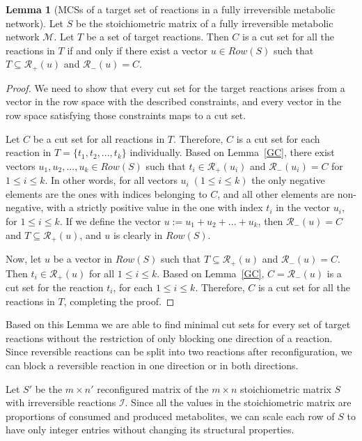 \documentclass{bioinfo}
\theoremstyle{plain}
\theoremstyle{definition}
\newtheorem{lemma}{Lemma} %
\begin{document}
\begin{lemma} [MCSs of a target set of reactions in a fully irreversible metabolic network] \label{FIR}
Let $S$ be the stoichiometric matrix of a fully irreversible metabolic network $\mathcal{M}$. Let $T$ be a set of target reactions. Then $C$ is a cut set for all the reactions in $T$ if and only if there exist a vector $u \in Row(S)$ such that $T \subseteq \mathcal{R}_{+}(u)$ and $\mathcal{R}_{-}(u) = C$. 
\end{lemma}
\begin{proof} %
We need to show that every cut set for the target reactions arises from a vector in the row space with the described constraints, and every vector in the row space satisfying those constraints maps to a cut set.

Let $C$ be a cut set for all reactions in $T$. Therefore, $C$ is a cut set for each reaction in $T = \{t_1, t_2, ..., t_k\}$ individually. Based on Lemma~\ref{GC}, there exist vectors $u_1, u_2, ..., u_k \in Row(S)$ such that $t_i \in \mathcal{R}_+(u_i)$ and $\mathcal{R}_{-}(u_i) = C$ for $1 \leq i \leq k$. In other words, for all vectors $u_i \; (1\leq i\leq k)$ the only negative elements are the ones with indices belonging to $C$, and all other elements are non-negative, with a strictly positive value in the one with index $t_i$ in the vector $u_i$, for $1 \leq i\leq k$. If we define the vector $u := u_1 + u_2 + ... + u_k$, then $\mathcal{R}_-(u) = C$ and $T \subseteq \mathcal{R}_+(u)$, and $u$ is clearly in $Row(S)$.

Now, let $u$ be a vector in $Row(S)$ such that $T \subseteq \mathcal{R}_{+}(u)$ and $\mathcal{R}_{-}(u) = C$. Then $t_i \in \mathcal{R}_+(u)$ for all $1\leq i\leq k$. Based on Lemma~\ref{GC}, $C = \mathcal{R}_{-}(u) $ is a cut set for the reaction $t_i$, for each $1\leq i\leq k$. Therefore, $C$ is a cut set for all the reactions in $T$, completing the proof.
\end{proof}

Based on this Lemma we are able to find minimal cut sets for every set of target reactions without the restriction of only blocking one direction of a reaction. Since reversible reactions can be split into two reactions after reconfiguration, we can block a reversible reaction in one direction or in both directions.

Let $S'$ be the $m \times n'$ reconfigured matrix of the $m \times n$ stoichiometric matrix $S$ with irreversible reactions $\mathcal{I}$. Since all the values in the stoichiometric matrix are proportions of consumed and produced metabolites, we can scale each row of $S$ to have only integer entries without changing its structural properties.
\end{document}
